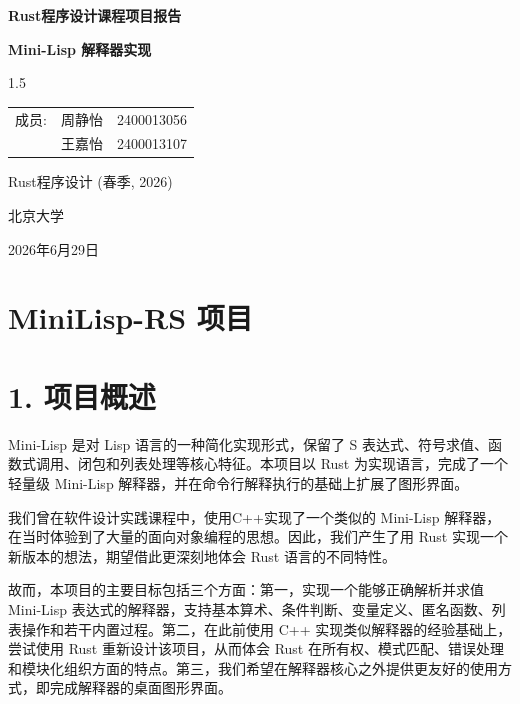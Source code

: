 \documentclass[12pt, a4paper]{ctexart}
\begin{document}
\begin{titlepage}
    \centering
    \vspace*{2cm}
    {\Huge \bfseries Rust程序设计课程项目报告 \par}
    \vspace{1cm}
    {\Large \bfseries Mini-Lisp 解释器实现 \par}
    
    \vspace{3cm}
    
    \begin{spacing}{1.5}
    \large
    \begin{tabular}{llc}
        成员: & 周静怡 & 2400013056 \\
              & 王嘉怡 & 2400013107 \\
    \end{tabular}
    \end{spacing}

    \vfill
    {\large Rust程序设计 (春季, 2026) \par}
    {\large 北京大学 \par}
    {\large 2026年6月29日 \par}
\end{titlepage}

\newpage
\tableofcontents
\newpage

\section*{MiniLisp-RS 项目}

\section*{1. 项目概述}

Mini-Lisp 是对 Lisp 语言的一种简化实现形式，保留了 S 表达式、符号求值、函数式调用、闭包和列表处理等核心特征。本项目以 Rust 为实现语言，完成了一个轻量级 Mini-Lisp 解释器，并在命令行解释执行的基础上扩展了图形界面。

我们曾在软件设计实践课程中，使用C++实现了一个类似的 Mini-Lisp 解释器，在当时体验到了大量的面向对象编程的思想。因此，我们产生了用 Rust 实现一个新版本的想法，期望借此更深刻地体会 Rust 语言的不同特性。

故而，本项目的主要目标包括三个方面：第一，实现一个能够正确解析并求值 Mini-Lisp 表达式的解释器，支持基本算术、条件判断、变量定义、匿名函数、列表操作和若干内置过程。第二，在此前使用 C++ 实现类似解释器的经验基础上，尝试使用 Rust 重新设计该项目，从而体会 Rust 在所有权、模式匹配、错误处理和模块化组织方面的特点。第三，我们希望在解释器核心之外提供更友好的使用方式，即完成解释器的桌面图形界面。
\end{document}
